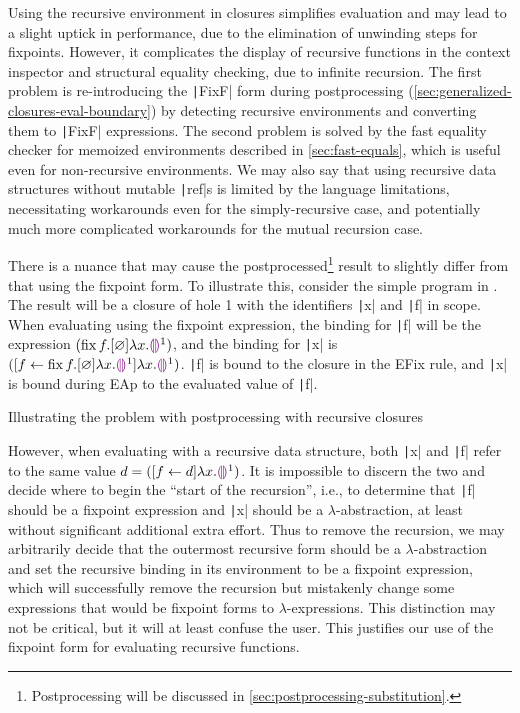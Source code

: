 Using the recursive environment in closures simplifies evaluation and may lead to a slight uptick in performance, due to the elimination of unwinding steps for fixpoints. However, it complicates the display of recursive functions in the context inspector and structural equality checking, due to infinite recursion. The first problem is re-introducing the \texttt|FixF| form during postprocessing (\cref{sec:generalized-closures-eval-boundary}) by detecting recursive environments and converting them to \texttt|FixF| expressions. The second problem is solved by the fast equality checker for memoized environments described in \cref{sec:fast-equals}, which is useful even for non-recursive environments. We may also say that using recursive data structures without mutable \texttt|ref|s is limited by the language limitations, necessitating workarounds even for the simply-recursive case, and potentially much more complicated workarounds for the mutual recursion case.

There is a nuance that may cause the postprocessed\footnote{Postprocessing will be discussed in \cref{sec:postprocessing-substitution}.} result to slightly differ from that using the fixpoint form. To illustrate this, consider the simple program in . The result will be a closure of hole 1 with the identifiers \texttt|x| and \texttt|f| in scope. When evaluating using the fixpoint expression, the binding for \texttt|f| will be the expression $(\operatorname{fix} f.[\varnothing]\lambda x.\textcolor{violet}{\llparenthesis}\textcolor{violet}{\rrparenthesis}^1)$, and the binding for \texttt|x| is $([f\leftarrow \operatorname{fix} f.[\varnothing]\lambda x.\textcolor{violet}{\llparenthesis}\textcolor{violet}{\rrparenthesis}^1]\lambda x.\textcolor{violet}{\llparenthesis}\textcolor{violet}{\rrparenthesis}^1)$. \texttt|f| is bound to the closure in the EFix rule, and \texttt|x| is bound during EAp to the evaluated value of \texttt|f|.

\begin{listing}
  \centering
  \caption{Illustrating the problem with postprocessing with recursive closures}
  \label{fig:rec-closures-issue}
\end{listing}

However, when evaluating with a recursive data structure, both \texttt|x| and \texttt|f| refer to the same value $d=([f\leftarrow d]\lambda x.\textcolor{violet}{\llparenthesis}\textcolor{violet}{\rrparenthesis}^1)$. It is impossible to discern the two and decide where to begin the ``start of the recursion'', i.e., to determine that \texttt|f| should be a fixpoint expression and \texttt|x| should be a $\lambda$-abstraction, at least without significant additional extra effort. Thus to remove the recursion, we may arbitrarily decide that the outermost recursive form should be a $\lambda$-abstraction and set the recursive binding in its environment to be a fixpoint expression, which will successfully remove the recursion but mistakenly change some expressions that would be fixpoint forms to $\lambda$-expressions. This distinction may not be critical, but it will at least confuse the user. This justifies our use of the fixpoint form for evaluating recursive functions.

